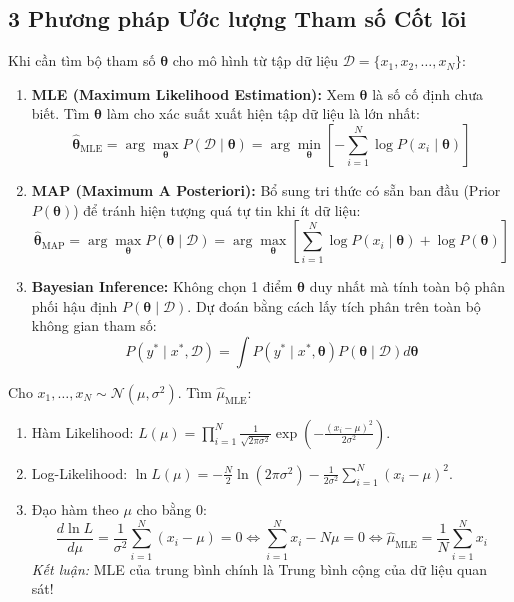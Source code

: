 \documentclass[11pt,a4paper]{article}
\begin{document}
\subsection{3 Phương pháp Ước lượng Tham số Cốt lõi}

\begin{mindsetbox}
Khi cần tìm bộ tham số $\boldsymbol{\theta}$ cho mô hình từ tập dữ liệu $\mathcal{D} = \{x_1, x_2, \dots, x_N\}$:
\begin{enumerate}
    \item \textbf{MLE (Maximum Likelihood Estimation):} Xem $\boldsymbol{\theta}$ là số cố định chưa biết. Tìm $\boldsymbol{\theta}$ làm cho xác suất xuất hiện tập dữ liệu là lớn nhất:
    $$\hat{\boldsymbol{\theta}}_{\text{MLE}} = \arg\max_{\boldsymbol{\theta}} P(\mathcal{D} \mid \boldsymbol{\theta}) = \arg\min_{\boldsymbol{\theta}} \left[ -\sum_{i=1}^N \log P(x_i \mid \boldsymbol{\theta}) \right]$$
    
    \item \textbf{MAP (Maximum A Posteriori):} Bổ sung tri thức có sẵn ban đầu (Prior $P(\boldsymbol{\theta})$) để tránh hiện tượng quá tự tin khi ít dữ liệu:
    $$\hat{\boldsymbol{\theta}}_{\text{MAP}} = \arg\max_{\boldsymbol{\theta}} P(\boldsymbol{\theta} \mid \mathcal{D}) = \arg\max_{\boldsymbol{\theta}} \left[ \sum_{i=1}^N \log P(x_i \mid \boldsymbol{\theta}) + \log P(\boldsymbol{\theta}) \right]$$
    
    \item \textbf{Bayesian Inference:} Không chọn 1 điểm $\boldsymbol{\theta}$ duy nhất mà tính toàn bộ phân phối hậu định $P(\boldsymbol{\theta} \mid \mathcal{D})$. Dự đoán bằng cách lấy tích phân trên toàn bộ không gian tham số:
    $$P(y^* \mid x^*, \mathcal{D}) = \int P(y^* \mid x^*, \boldsymbol{\theta}) P(\boldsymbol{\theta} \mid \mathcal{D}) d\boldsymbol{\theta}$$
\end{enumerate}
\end{mindsetbox}

\begin{examplebox}
Cho $x_1, \dots, x_N \sim \mathcal{N}(\mu, \sigma^2)$. Tìm $\hat{\mu}_{\text{MLE}}$:
\begin{enumerate}
    \item Hàm Likelihood: $L(\mu) = \prod_{i=1}^N \frac{1}{\sqrt{2\pi\sigma^2}} \exp\left( -\frac{(x_i - \mu)^2}{2\sigma^2} \right)$.
    \item Log-Likelihood: $\ln L(\mu) = -\frac{N}{2} \ln(2\pi\sigma^2) - \frac{1}{2\sigma^2} \sum_{i=1}^N (x_i - \mu)^2$.
    \item Đạo hàm theo $\mu$ cho bằng 0: 
    $$\frac{d \ln L}{d\mu} = \frac{1}{\sigma^2} \sum_{i=1}^N (x_i - \mu) = 0 \iff \sum_{i=1}^N x_i - N\mu = 0 \iff \hat{\mu}_{\text{MLE}} = \frac{1}{N} \sum_{i=1}^N x_i$$
    \textit{Kết luận:} MLE của trung bình chính là Trung bình cộng của dữ liệu quan sát!
\end{enumerate}
\end{examplebox}
\end{document}
